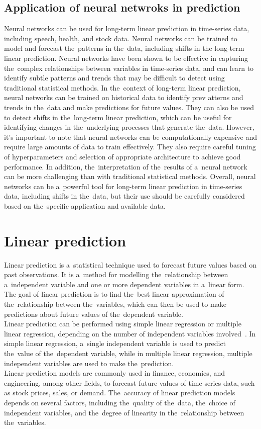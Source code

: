 \subsection{Application of neural netwroks in prediction} \label{subsec:nnprediction}
Neural networks can be used for long-term linear prediction in time-series data, including speech, health, and
stock data. Neural networks can be trained to model and forecast the~patterns in the~data, including shifts in
the long-term linear prediction. Neural networks have been shown to be effective in capturing the~complex relationships
between variables in time-series data, and can learn to identify subtle patterns and trends that may be difficult
to detect using traditional statistical methods. In the~context of long-term linear prediction, neural networks can be
trained on historical data to identify prev    atterns and trends in the~data and make predictions for future values.
They can also be used to detect shifts in the~long-term linear prediction, which can be useful for identifying
changes in the~underlying processes that generate the~data. However, it's important to note that neural networks
can be computationally expensive and require large amounts of data to train effectively. They also require careful
tuning of hyperparameters and selection of appropriate architecture to achieve good performance.
In addition, the~interpretation of the~results of a~neural network can be more challenging than with traditional
statistical methods. Overall, neural networks can be a~powerful tool for long-term linear prediction in time-series
data, including shifts in the~data, but their use should be carefully considered based on the~specific
application and available data.


\section{Linear prediction} \label{sec:lp}
Linear prediction is a~statistical technique used to forecast future values based on past observations. It is a~method
for modelling the~relationship between a~independent variable and one or more dependent variables in a~linear form.
The goal of linear prediction is to find the~best linear approximation of the~relationship between the~variables,
which can then be used to make predictions about future values of the~dependent variable.
\\
Linear prediction can be performed using simple linear regression or multiple linear regression, depending on the
number of independent variables involved~\cite{Parks}. In simple linear regression, a~single independent variable is
used to predict the~value of the~dependent variable, while in multiple linear regression, multiple independent
variables are used to make the~prediction.
\\
Linear prediction models are commonly used in finance, economics, and engineering, among other fields, to forecast
future values of time series data, such as stock prices, sales, or demand. The~accuracy of linear prediction models
depends on several factors, including the~quality of the~data, the~choice of independent variables, and the~degree of
linearity in the~relationship between the~variables.

